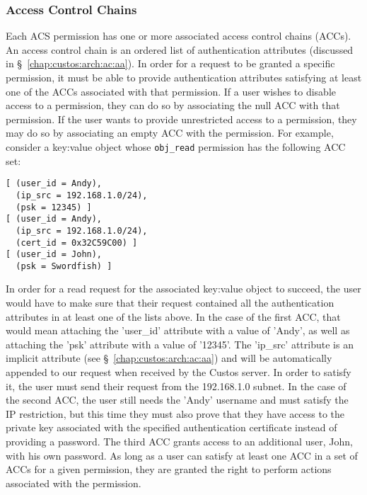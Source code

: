 \subsubsection{Access Control Chains}
\label{chap:custos:arch:ac:acc}

Each ACS permission has one or more associated access control chains
(ACCs). An access control chain is an ordered list of authentication
attributes (discussed in \S~\ref{chap:custos:arch:ac:aa}). In order for a
request to be granted a specific permission, it must be able to
provide authentication attributes satisfying at least one of the ACCs
associated with that permission. If a user wishes to disable access to
a permission, they can do so by associating the null ACC with that
permission. If the user wants to provide unrestricted access to a
permission, they may do so by associating an empty ACC with the
permission. For example, consider a key:value object whose
\texttt{obj\_read} permission has the following ACC set:

\begin{Verbatim}[samepage=true, fontsize=\footnotesize]
[ (user_id = Andy),
  (ip_src = 192.168.1.0/24),
  (psk = 12345) ]
[ (user_id = Andy),
  (ip_src = 192.168.1.0/24),
  (cert_id = 0x32C59C00) ]
[ (user_id = John),
  (psk = Swordfish) ]
\end{Verbatim}

In order for a read request for the associated key:value object to
succeed, the user would have to make sure that their request contained
all the authentication attributes in at least one of the lists
above. In the case of the first ACC, that would mean attaching the
'user\_id' attribute with a value of 'Andy', as well as attaching the
'psk' attribute with a value of '12345'. The 'ip\_src' attribute is an
implicit attribute (see \S~\ref{chap:custos:arch:ac:aa}) and will be
automatically appended to our request when received by the Custos
server. In order to satisfy it, the user must send their request from
the 192.168.1.0 subnet. In the case of the second ACC, the user still
needs the 'Andy' username and must satisfy the IP restriction, but
this time they must also prove that they have access to the private
key associated with the specified authentication certificate instead
of providing a password. The third ACC grants access to an additional
user, John, with his own password. As long as a user can satisfy at
least one ACC in a set of ACCs for a given permission, they are
granted the right to perform actions associated with the permission.


